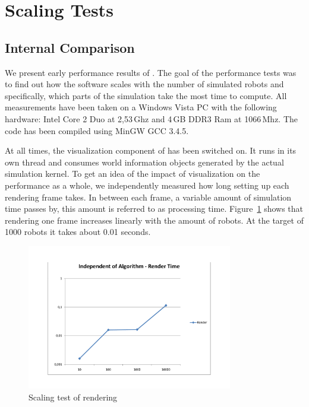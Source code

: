 
\section{Scaling Tests}
\subsection{Internal Comparison}

We present early performance results of \RSS. The goal of the performance tests was to find out how the software scales with the number of simulated robots and specifically, which parts of the simulation take the most time to compute. All measurements have been taken on a Windows Vista PC with the following hardware: Intel Core 2 Duo at 2,53\,Ghz and 4\,GB DDR3 Ram at 1066\,Mhz. The code has been compiled using {\sffamily MinGW GCC 3.4.5}.

At all times, the visualization component of \RSS has been switched on. It runs in its own thread and consumes world information objects generated by the actual simulation kernel. To get an idea of the impact of visualization on the performance as a whole, we independently measured how long setting up each rendering frame takes. In between each frame, a variable amount of simulation time passes by, this amount is referred to as processing time. Figure~\ref{pic:scaling:render} shows that rendering one frame increases linearly with the amount of robots. At the target of 1000 robots it takes about 0.01 seconds. 

\begin{figure}[p]
	\begin{center}
	\includegraphics[width=0.8\textwidth]{scaling-render}
	\caption{Scaling test of rendering}
	\label{pic:scaling:render}
	\end{center}
\end{figure}

